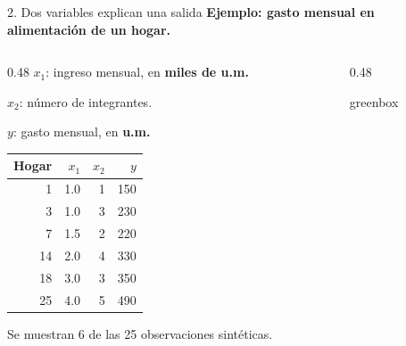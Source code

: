 \documentclass[10pt,aspectratio=169,xcolor={dvipsnames}]{beamer}
\newenvironment{caja}[1][lgraybox]{\begin{beamercolorbox}[sep=0.7em,wd=\linewidth]{#1}}{\end{beamercolorbox}}
\begin{document}
\begin{frame}{2. Dos variables explican una salida}
    \textbf{Ejemplo: gasto mensual en alimentación de un hogar.}\par\medskip
    \begin{columns}[T]
        \begin{column}{0.48\textwidth}
            \small
            $x_1$: ingreso mensual, en \textbf{miles de u.m.}\par\smallskip
            $x_2$: número de integrantes.\par\smallskip
            $y$: gasto mensual, en \textbf{u.m.}\par\medskip
            \centering
            \begin{tabular}{rrrr}
                \toprule
                Hogar & $x_1$ & $x_2$ & $y$\\
                \midrule
                1 & 1.0 & 1 & 150\\
                3 & 1.0 & 3 & 230\\
                7 & 1.5 & 2 & 220\\
                14 & 2.0 & 4 & 330\\
                18 & 3.0 & 3 & 350\\
                25 & 4.0 & 5 & 490\\
                \bottomrule
            \end{tabular}
            \par\smallskip
            {\scriptsize Se muestran 6 de las 25 observaciones sintéticas.}
        \end{column}
        \begin{column}{0.48\textwidth}
            \centering
            \par\smallskip
            \begin{caja}[greenbox]

\end{caja}
\end{column}
\end{columns}
\end{frame}
\end{document}
